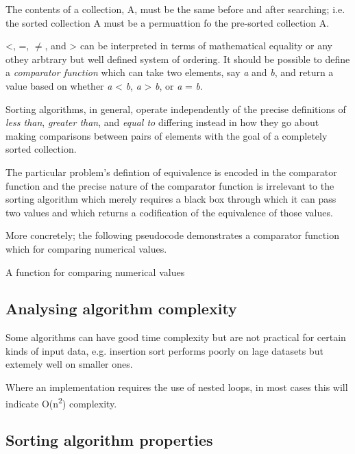 \documentclass[12pt, a4paper]{article}
\begin{document}
The contents of a collection, A, must be the same before and after searching; i.e. the sorted collection A must be a permuattion fo the pre-sorted collection A.

<, =, $\ne$, and > can be interpreted in terms of mathematical equality or any othey arbtrary but well defined system of ordering. It should be possible to define a \emph{comparator function} which can take two elements, say \emph{a} and \emph{b}, and return a value based on whether \emph{a} < \emph{b}, \emph{a} > \emph{b}, or \emph{a} = \emph{b}.

Sorting algorithms, in general, operate independently of the precise definitions of \emph{less than}, \emph{greater than}, and \emph{equal to} differing instead in how they go about making comparisons between pairs of elements with the goal of a completely sorted collection.

The particular problem's defintion of equivalence is encoded in the comparator function and the precise nature of the comparator function is irrelevant to the sorting algorithm which merely requires a black box through which it can pass two values and which returns a codification of the equivalence of those values.

More concretely; the following pseudocode demonstrates a comparator function which for comparing numerical values.

\begin{algorithm}
\caption{A function for comparing numerical values}\label{euclid}
\begin{algorithmic}[1]
 
\EndIf
{} 
\EndIf
{} 
\EndIf
\EndProcedure
\end{algorithmic}
\end{algorithm}

\subsection{Analysing algorithm complexity}

Some algorithms can have good time complexity but are not practical for certain kinds of input data, e.g. insertion sort performs poorly on lage datasets but extemely well on smaller ones.

Where an implementation requires the use of nested loops, in most cases this will indicate O(n\textsuperscript{2}) complexity.

\subsection{Sorting algorithm properties}
\end{document}
